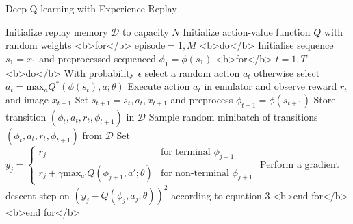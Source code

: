 Deep Q-learning with Experience Replay

Initialize replay memory \( \mathcal{D} \) to capacity \( N \)
Initialize action-value function \( Q \) with random weights
<b>for</b> \( \text{episode} = 1, M \) <b>do</b>
	Initialise sequence \( s_1 = { x_1 } \) and preprocessed sequenced \( \phi_1 = \phi(s_1) \)
	<b>for</b> \( t = 1, T \) <b>do</b>
		With probability \( \epsilon \) select a random action \( a_t \)
		otherwise select \( a_t = \text{max}_a{Q^*(\phi(s_t), a; \theta)} \)
		Execute action \( a_t \) in emulator and observe reward \( r_t \) and image \( x_{t+1} \)
		Set \( s_{t+1} = s_t, a_t, x_{t+1} \) and preprocess \( \phi_{t+1} = \phi(s_{t+1}) \)
		Store transition \( (\phi_t, a_t, r_t, \phi_{t+1}) \) in \( \mathcal{D} \)
		Sample random minibatch of transitions \( (\phi_t, a_t, r_t, \phi_{t+1}) \) from \( \mathcal{D} \)
		Set \( y_j = \begin{cases} r_j & \text{for terminal } \phi_{j+1} \\ r_j + \gamma \text{max}_{a'}{Q(\phi_{j+1}, a'; \theta)} & \text{for non-terminal } \phi_{j+1} \end{cases} \)
		Perform a gradient descent step on \( (y_j - Q(\phi_j, a_j; \theta))^2 \) according to equation 3
	<b>end for</b>
<b>end for</b>
